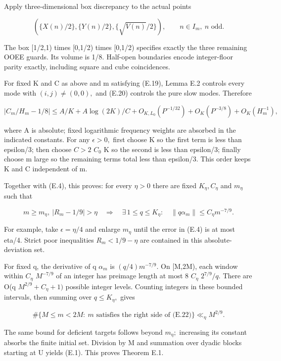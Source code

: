 \documentclass[11pt,a4paper]{article}
\begin{document}
Apply three-dimensional box discrepancy to the actual points

\[
 \left(\{X(n)/2\},\{Y(n)/2\},\{\sqrt{V(n)}/2\}\right),
                  \qquad n\in I_m,\ n\text{ odd}.
\]

The box {[}1/2,1) times {[}0,1/2) times {[}0,1/2) specifies exactly the
three remaining OOEE guards. Its volume is 1/8. Half-open boundaries
encode integer-floor parity exactly, including square and cube
coincidences.

For fixed K and C as above and m satisfying (E.19), Lemma E.2 controls
every mode with \((i,j)\ne (0,0),\) and (E.20) controls the pure slow
modes. Therefore

\[
 \left|C_m/H_m-1/8\right|
   \le A/K+A\log(2K)/C+O_{K,L_0}(P^{-1/32})
                         +O_K(P^{-3/8})+O_K(H_m^{-1}),
 \tag{E.21}
\]

where A is absolute; fixed logarithmic frequency weights are absorbed in
the indicated constants. For any \(\epsilon>0,\) first choose K so the
first term is less than epsilon/3; then choose \(C>2\) \(C_0\) K so the
second is less than epsilon/3; finally choose m large so the remaining
terms total less than epsilon/3. This order keeps K and C independent of
m.

Together with (E.4), this proves: for every \(\eta>0\) there are fixed
\(K_\eta,C_\eta\) and \(m_\eta\) such that

\[
 m\ge m_\eta,\ |R_m-1/9|>\eta
 \quad\Longrightarrow\quad
 \exists\,1\le q\le K_\eta:\quad
       \|q\alpha_m\|\le C_\eta m^{-7/9}.
 \tag{E.22}
\]

For example, take \(\epsilon=\eta/4\) and enlarge \(m_\eta\) until the
error in (E.4) is at most eta/4. Strict poor inequalities
\(R_m<1/9-\eta\) are contained in this absolute-deviation set.

For fixed q, the derivative of q \(\alpha_m\) is \((q/4)m^{-7/9}.\) On
{[}M,2M), each window within \(C_\eta\) \(M^{-7/9}\) of an integer has
preimage length at most 8 \(C_\eta\) \(2^{7/9}/q.\) There are O(q
\(M^{2/9}+C_\eta+1)\) possible integer levels. Counting integers in
these bounded intervals, then summing over \(q\le K_\eta,\) gives

\[
 \#\{M\le m<2M:\ m\text{ satisfies the right side of (E.22)}\}
                \ll_\eta M^{2/9}.
 \tag{E.23}
\]

The same bound for deficient targets follows beyond \(m_\eta;\)
increasing its constant absorbs the finite initial set. Division by M
and summation over dyadic blocks starting at U yields (E.1). This proves
Theorem E.1.
\end{document}
